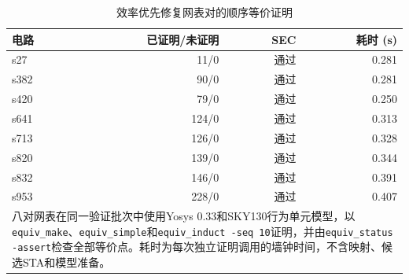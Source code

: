 \begin{table}[htbp]
\centering
\caption{效率优先修复网表对的顺序等价证明}
\label{tab:sec_iscas8}
\setlength{\tabcolsep}{4pt}
\footnotesize
\begin{tabular}{lrrr}
\toprule
\textbf{电路} & \textbf{已证明/未证明} & \textbf{SEC} & \textbf{耗时 (s)} \\
\midrule
s27 & 11/0 & 通过 & 0.281 \\
s382 & 90/0 & 通过 & 0.281 \\
s420 & 79/0 & 通过 & 0.250 \\
s641 & 124/0 & 通过 & 0.313 \\
s713 & 126/0 & 通过 & 0.328 \\
s820 & 139/0 & 通过 & 0.344 \\
s832 & 146/0 & 通过 & 0.391 \\
s953 & 228/0 & 通过 & 0.407 \\
\bottomrule
\multicolumn{4}{p{0.92\columnwidth}}{\footnotesize 八对网表在同一验证批次中使用Yosys 0.33和SKY130行为单元模型，以\texttt{equiv\_make}、\texttt{equiv\_simple}和\texttt{equiv\_induct -seq 10}证明，并由\texttt{equiv\_status -assert}检查全部等价点。耗时为每次独立证明调用的墙钟时间，不含映射、候选STA和模型准备。}\\
\end{tabular}
\end{table}